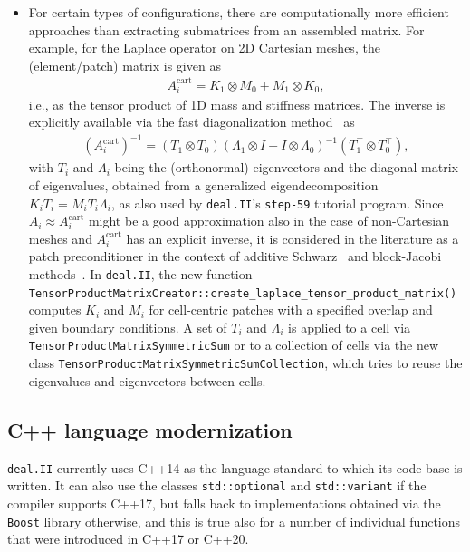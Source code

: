\documentclass{ansarticle-preprint}
\newcommand{\specialword}[1]{\texttt{#1}}
\newcommand{\dealii}{{\specialword{deal.II}}\xspace}
\newcommand{\boost}{{\specialword{Boost}}\xspace}
\begin{document}
\begin{itemize}
  \item For certain types of configurations, there are computationally more efficient
  approaches than extracting submatrices from an assembled matrix. For
  example, for the Laplace
  operator on 2D Cartesian meshes, the (element/patch) matrix is given as
  \begin{align*}
  A_i^{\text{cart}} = K_1 \otimes M_0 + M_1 \otimes K_0,
  \end{align*}
  i.e., as the tensor product of 1D mass and stiffness matrices. The inverse is
  explicitly available via the fast diagonalization method~\cite{lynch1964direct} as
  \begin{align*}
  \left(A_i^{\text{cart}}\right)^{-1} = (T_1 \otimes T_0) (\Lambda_1 \otimes I + I \otimes \Lambda_0)^{-1} (T_1^\top \otimes T_0^\top),
  \end{align*}
  with $T_i$ and $\Lambda_i$ being the (orthonormal) eigenvectors and the diagonal
  matrix of eigenvalues, obtained from a generalized eigendecomposition
  $K_iT_i =  M_i T_i \Lambda_i$, as also used by \dealii's \texttt{step-59} tutorial program.
  Since $A_i \approx A_i^{\text{cart}}$
  might be a good approximation also in the case of non-Cartesian meshes and
  $A_i^{\text{cart}}$ has an explicit inverse, it is considered in the
  literature as a patch preconditioner in the context of additive
  Schwarz~\cite{witte2021fast, phillips2021auto, couzy1995spectral} and block-Jacobi methods~\cite{kronbichler2019hermite}.
  In \dealii, the new function
  \texttt{Tensor\-Product\-Matrix\-Creator::create\_\allowbreak laplace\_\allowbreak tensor\_\allowbreak product\_\allowbreak matrix()} computes $K_i$ and $M_i$
  for cell-centric patches with a specified overlap and given boundary conditions.
  A set of $T_i$ and $\Lambda_i$ is applied to a cell via
  \texttt{Tensor\-Product\-Matrix\-Symmetric\-Sum} or to a collection of cells
  via the new class \texttt{Tensor\-Product\-Matrix\-Symmetric\-Sum\-Collection}, which
  tries to reuse the eigenvalues and eigenvectors between cells.
\end{itemize}


\subsection{C++ language modernization}\label{sec:language}

\dealii{} currently uses C++14 as the language standard to which its
code base is written. It can also use the classes
\texttt{std::optional} and \texttt{std::variant} if the compiler
supports C++17, but falls back to implementations obtained via the
\boost library otherwise, and this is true also for a number of
individual functions that were introduced in C++17 or C++20.
\end{document}
